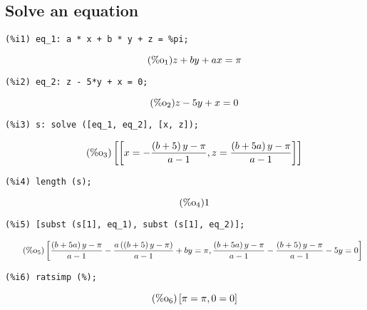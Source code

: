 \documentclass[12pt,leqno]{article}
\begin{document}
\subsection{Solve an equation}
\begin{verbatim}
(%i1) eq_1: a * x + b * y + z = %pi;
\end{verbatim}
\begin{equation}
\tag{$\mathop{\mathrm{\%o}}_{1}$}z+b y+a x = \pi
\label{eq:doc-group1-code28-1-1}
\end{equation}
\begin{verbatim}
(%i2) eq_2: z - 5*y + x = 0;
\end{verbatim}
\begin{equation}
\tag{$\mathop{\mathrm{\%o}}_{2}$}z-5 y+x = 0
\label{eq:doc-group1-code28-2-1}
\end{equation}
\begin{verbatim}
(%i3) s: solve ([eq_1, eq_2], [x, z]);
\end{verbatim}
\begin{equation}
\tag{$\mathop{\mathrm{\%o}}_{3}$}\left[\left[x = -\frac{\left(b+5\right) y-\pi}{a-1}, z = \frac{\left(b+5 a\right) y-\pi}{a-1}\right]\right]
\label{eq:doc-group1-code28-3-1}
\end{equation}
\begin{verbatim}
(%i4) length (s);
\end{verbatim}
\begin{equation}
\tag{$\mathop{\mathrm{\%o}}_{4}$}1
\label{eq:doc-group1-code28-4-1}
\end{equation}
\begin{verbatim}
(%i5) [subst (s[1], eq_1), subst (s[1], eq_2)];
\end{verbatim}
\begin{equation}
\tag{$\mathop{\mathrm{\%o}}_{5}$}\left[\frac{\left(b+5 a\right) y-\pi}{a-1}-\frac{a \left(\left(b+5\right) y-\pi\right)}{a-1}+b y = \pi, \frac{\left(b+5 a\right) y-\pi}{a-1}-\frac{\left(b+5\right) y-\pi}{a-1}-5 y = 0\right]
\label{eq:doc-group1-code28-5-1}
\end{equation}
\begin{verbatim}
(%i6) ratsimp (%);
\end{verbatim}
\begin{equation}
\tag{$\mathop{\mathrm{\%o}}_{6}$}\left[\pi = \pi, 0 = 0\right]
\label{eq:doc-group1-code28-6-1}
\end{equation}
\end{document}
